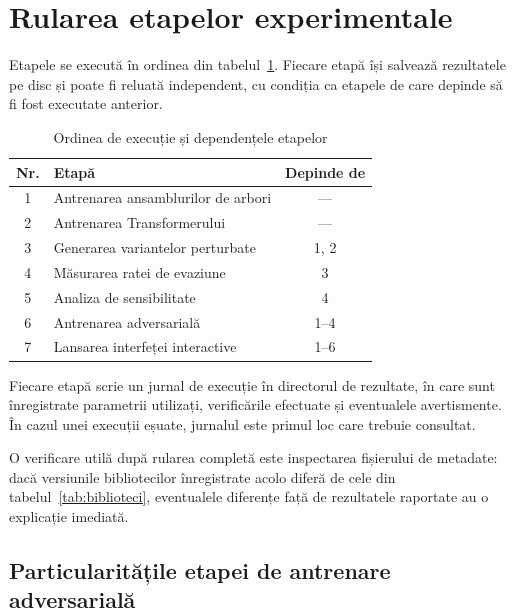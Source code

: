 \section{Rularea etapelor experimentale}\label{sec:rulare}

Etapele se execută în ordinea din tabelul~\ref{tab:rulare}. Fiecare etapă își salvează rezultatele pe disc și poate fi reluată independent, cu condiția ca etapele de care depinde să fi fost executate anterior.

\begin{table}[H]
    \caption{Ordinea de execuție și dependențele etapelor}
    \centering
    \begin{tabular}{|c|p{7.0cm}|c|}
        \hline
        \textbf{Nr.} & \textbf{Etapă} & \textbf{Depinde de} \\
        \hline
        1 & Antrenarea ansamblurilor de arbori & --- \\
        \hline
        2 & Antrenarea Transformerului & --- \\
        \hline
        3 & Generarea variantelor perturbate & 1, 2 \\
        \hline
        4 & Măsurarea ratei de evaziune & 3 \\
        \hline
        5 & Analiza de sensibilitate & 4 \\
        \hline
        6 & Antrenarea adversarială & 1--4 \\
        \hline
        7 & Lansarea interfeței interactive & 1--6 \\
        \hline
    \end{tabular}
    \label{tab:rulare}
\end{table}

Fiecare etapă scrie un jurnal de execuție în directorul de rezultate, în care sunt înregistrate parametrii utilizați, verificările efectuate și eventualele avertismente. În cazul unei execuții eșuate, jurnalul este primul loc care trebuie consultat.

O verificare utilă după rularea completă este inspectarea fișierului de metadate: dacă versiunile bibliotecilor înregistrate acolo diferă de cele din tabelul~\ref{tab:biblioteci}, eventualele diferențe față de rezultatele raportate au o explicație imediată.

\subsection{Particularitățile etapei de antrenare adversarială}
\label{subsec:rulare-adversarial}

